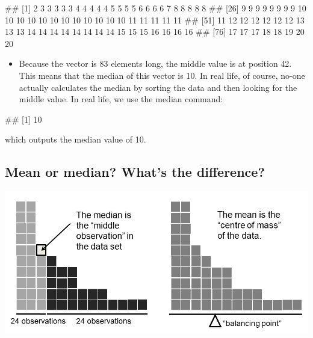 \documentclass[
]{book}
\newenvironment{Shaded}{\begin{snugshade}}{\end{snugshade}}
\newcommand{\FunctionTok}[1]{\textcolor[rgb]{0.13,0.29,0.53}{\textbf{#1}}}
\newcommand{\NormalTok}[1]{#1}
\newcommand{\SpecialCharTok}[1]{\textcolor[rgb]{0.81,0.36,0.00}{\textbf{#1}}}
\providecommand{\tightlist}{%
  \setlength{\itemsep}{0pt}\setlength{\parskip}{0pt}}
\begin{document}
\begin{Shaded}
\end{Shaded}

\begin{Shaded}
\begin{Highlighting}[]
\NormalTok{\#\#  [1]  2  3  3  3  3  3  4  4  4  4  4  5  5  5  5  6  6  6  6  7  8  8  8  8  8}
\NormalTok{\#\# [26]  9  9  9  9  9  9  9  9 10 10 10 10 10 10 10 10 10 10 10 10 11 11 11 11 11}
\NormalTok{\#\# [51] 11 12 12 12 12 12 12 13 13 13 14 14 14 14 14 14 14 14 15 15 15 16 16 16 16}
\NormalTok{\#\# [76] 17 17 17 18 18 19 20 20}
\end{Highlighting}
\end{Shaded}

\begin{itemize}
\tightlist
\item
  Because the vector is 83 elements long, the middle value is at position 42. This means that the median of this vector is 10. In real life, of course, no-one actually calculates the median by sorting the data and then looking for the middle value. In real life, we use the median command:
\end{itemize}

\begin{Shaded}
\end{Shaded}

\begin{Shaded}
\begin{Highlighting}[]
\NormalTok{\#\# [1] 10}
\end{Highlighting}
\end{Shaded}

which outputs the median value of 10.

\subsection{Mean or median? What's the difference?}\label{mean-or-median-whats-the-difference}

\includegraphics{./img/descriptives2/meanmedian.png}
\end{document}
